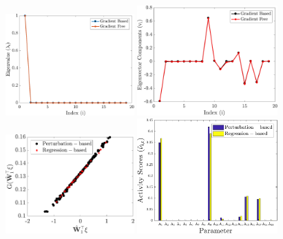 \documentclass[1pt]{elsarticle}
\begin{document}
\begin{figure}[htbp]
 \begin{center}
  \includegraphics[width=0.44\textwidth]{./Figures/comp_eig}
\hspace{1mm}
  \includegraphics[width=0.48\textwidth]{./Figures/comp_eigv}
  \\ \vspace{5mm}
  \includegraphics[width=0.44\textwidth]{./Figures/comp_ssp}
\hspace{1mm}
  \includegraphics[width=0.48\textwidth]{./Figures/comp_as}
\end{center}
\end{figure}
\end{document}
